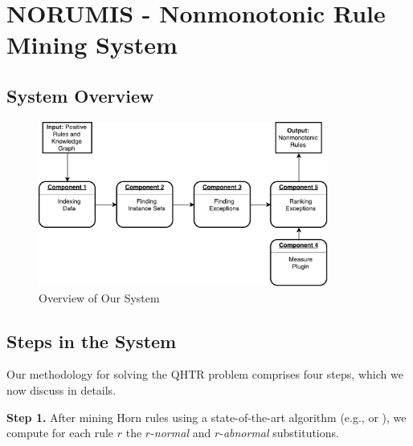 \chapter{NORUMIS - Nonmonotonic Rule Mining System}\label{sec:meth}

\section{System Overview}

\begin{figure}[ht]
\centering
\includegraphics[width=0.85\textwidth]{figures/system_overview}
\caption{Overview of Our System}
\label{rdf}
\end{figure}

\section{Steps in the System}

Our methodology for solving the QHTR problem comprises four steps, which we now discuss in details.
\medskip

\noindent \textbf{Step 1.} After mining Horn rules using a state-of-the-art algorithm (e.g., \cite{newrulemine} or \cite{amieplus}), we compute for each rule $r$ the $r$-\emph{normal} and $r$-\emph{abnormal} substitutions.
\medskip


